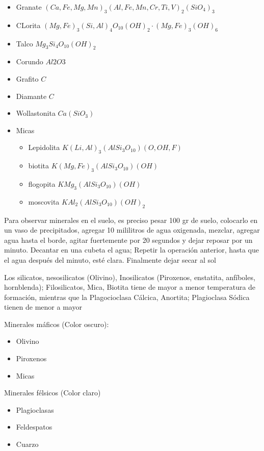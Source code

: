 \begin{itemize}
    \item Granate $(Ca,Fe,Mg,Mn)_3(Al, Fe, Mn,Cr,Ti,V)_2(SiO_4)_3$
    \item CLorita $(Mg,Fe)_3(Si,Al)_4O_{10} (OH)_2\cdot (Mg,Fe)_3(OH)_6$
    \item Talco $Mg_3Si_4O_{10}(OH)_2$
    \item Corundo $Al2O3$
    \item Grafito $C$
    \item Diamante $C$
    \item Wollastonita $Ca(SiO_3)$
    \item Micas 
    \begin{itemize}
        \item Lepidolita $K(Li,Al)_3 (AlSi_3O_{10}) (O, OH, F)$
        \item biotita $K (Mg,Fe)_3 (AlSi_3O_{10})(OH)$
        \item flogopita $KMg_3(AlSi_3O_{10})(OH)$
        \item moscovita $KAl_2(AlSi_3O_{10})(OH)_2$
    \end{itemize}
\end{itemize}

Para observar minerales en el suelo, es preciso pesar 100 gr de suelo, colocarlo en un vaso de precipitados, agregar 10 mililitros de agua oxigenada, mezclar,
agregar agua hasta el borde, agitar fuertemente por 20 segundos y dejar reposar por un minuto. Decantar en una cubeta el agua; Repetir la operación anterior, hasta que el agua después del minuto, esté clara. Finalmente dejar secar al sol

Los silicatos, nesosilicatos (Olivino), Inosilicatos (Piroxenos, enstatita, anfíboles, hornblenda); Filosilicatos, Mica, Biotita tiene de mayor a menor temperatura de formación, mientras que la Plagocioclasa Cálcica, Anortita; Plagioclasa Sódica tienen de menor a mayor

Minerales máficos (Color oscuro):
\begin{itemize}
    \item Olivino
    \item Piroxenos 
    \item Micas
\end{itemize}

Minerales félsicos (Color claro)

\begin{itemize}
    \item Plagioclasas 
    \item Feldespatos 
    \item Cuarzo
\end{itemize}


